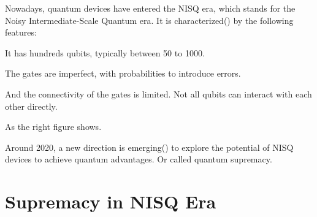 \documentclass[10pt]{beamer}
\begin{document}
\begin{CJK}{UTF8}{gbsn}
{Nowadays, quantum devices have entered the NISQ era, which stands for the Noisy Intermediate-Scale Quantum era. It is characterized() by the following features:

It has hundreds qubits, typically between 50 to 1000.

The gates are imperfect, with probabilities to introduce errors. 

And the connectivity of the gates is limited. Not all qubits can interact with each other directly.

As the right figure shows. 

Around 2020, a new direction is emerging() to explore the potential of NISQ devices to achieve quantum advantages. Or called quantum supremacy.
}

\section{Supremacy in NISQ Era}


\end{CJK}
\end{document}
